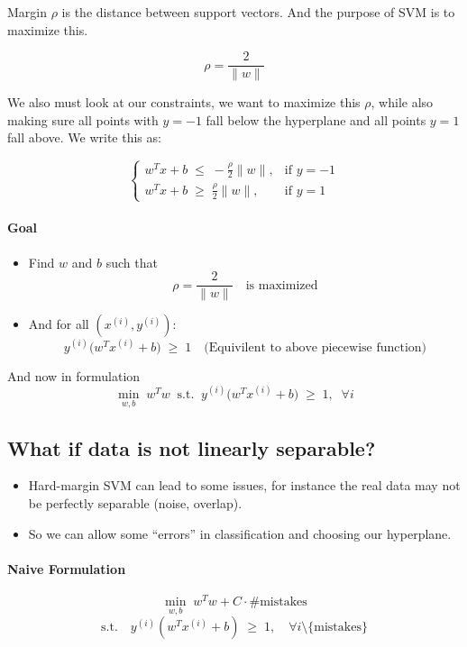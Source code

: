\documentclass[11pt]{article}
\begin{document}
Margin $\rho$ is the distance between support vectors. And the purpose of SVM is to maximize this.

\[
	\rho = \frac{2}{\|w\|}
\]

We also must look at our constraints, we want to maximize this $\rho$, while also making sure all points with $y=-1$ fall below the hyperplane and all points $y=1$ fall above. We write this as:

\[
	\begin{cases}
		w^T x + b \;\leq\; -\tfrac{\rho}{2}\|w\|, & \text{if } y = -1 \\[6pt]
		w^T x + b \;\geq\; \tfrac{\rho}{2}\|w\|,  & \text{if } y = 1
	\end{cases}
\]

\paragraph{Goal}
\begin{itemize}
	\item Find $w$ and $b$ such that
	      \[
		      \rho = \frac{2}{\|w\|} \quad \text{is maximized}
	      \]
	\item And for all $(x^{(i)}, y^{(i)})$:
	      \[
		      y^{(i)} \big(w^T x^{(i)} + b\big) \;\geq\; 1 \quad \text{(Equivilent to above piecewise function)}
	      \]
\end{itemize}

And now in formulation
\[
	\min_{w,b} \; w^Tw \; \; \text{s.t.} \; \; y^{(i)} \big(w^T x^{(i)} + b\big) \;\geq\; 1,
	\; \; \forall i
\]

\subsection*{What if data is not linearly separable?}

\begin{itemize}
	\item Hard-margin SVM can lead to some issues, for instance the real data may not be perfectly separable (noise, overlap).
	\item So we can allow some ``errors'' in classification and choosing our hyperplane.
\end{itemize}

\paragraph*{Naive Formulation}
\[
	\min_{w,b} \; w^T w + C \cdot \#\text{mistakes}
\]
\[
	\text{s.t.} \quad y^{(i)}(w^T x^{(i)} + b) \;\geq\; 1, \quad \forall i \setminus \{\text{mistakes}\}
\]
\end{document}
